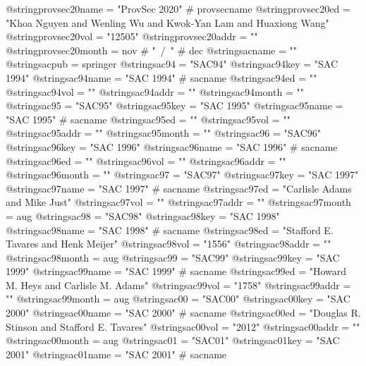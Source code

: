 @string{provsec20name =         "ProvSec 2020" # provsecname}
@string{provsec20ed =           "Khoa Nguyen and Wenling Wu and Kwok-Yan Lam and Huaxiong Wang"}
@string{provsec20vol =          "12505"}
@string{provsec20addr =         ""}
@string{provsec20month =        nov # "~/~" # dec}
@string{sacname =               ""}
@string{sacpub =                springer}
@string{sac94 =                 "SAC94"}
@string{sac94key =              "SAC 1994"}
@string{sac94name =             "SAC 1994" # sacname}
@string{sac94ed =               ""}
@string{sac94vol =              ""}
@string{sac94addr =             ""}
@string{sac94month =            ""}
@string{sac95 =                 "SAC95"}
@string{sac95key =              "SAC 1995"}
@string{sac95name =             "SAC 1995" # sacname}
@string{sac95ed =               ""}
@string{sac95vol =              ""}
@string{sac95addr =             ""}
@string{sac95month =            ""}
@string{sac96 =                 "SAC96"}
@string{sac96key =              "SAC 1996"}
@string{sac96name =             "SAC 1996" # sacname}
@string{sac96ed =               ""}
@string{sac96vol =              ""}
@string{sac96addr =             ""}
@string{sac96month =            ""}
@string{sac97 =                 "SAC97"}
@string{sac97key =              "SAC 1997"}
@string{sac97name =             "SAC 1997" # sacname}
@string{sac97ed =               "Carlisle Adams and Mike Just"}
@string{sac97vol =              ""}
@string{sac97addr =             ""}
@string{sac97month =            aug}
@string{sac98 =                 "SAC98"}
@string{sac98key =              "SAC 1998"}
@string{sac98name =             "SAC 1998" # sacname}
@string{sac98ed =               "Stafford E. Tavares and Henk Meijer"}
@string{sac98vol =              "1556"}
@string{sac98addr =             ""}
@string{sac98month =            aug}
@string{sac99 =                 "SAC99"}
@string{sac99key =              "SAC 1999"}
@string{sac99name =             "SAC 1999" # sacname}
@string{sac99ed =               "Howard M. Heys and Carlisle M. Adams"}
@string{sac99vol =              "1758"}
@string{sac99addr =             ""}
@string{sac99month =            aug}
@string{sac00 =                 "SAC00"}
@string{sac00key =              "SAC 2000"}
@string{sac00name =             "SAC 2000" # sacname}
@string{sac00ed =               "Douglas R. Stinson and Stafford E. Tavares"}
@string{sac00vol =              "2012"}
@string{sac00addr =             ""}
@string{sac00month =            aug}
@string{sac01 =                 "SAC01"}
@string{sac01key =              "SAC 2001"}
@string{sac01name =             "SAC 2001" # sacname}
